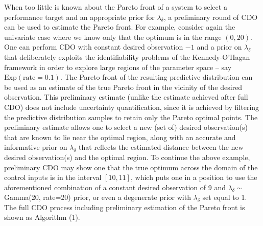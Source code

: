 \documentclass{article}
\begin{document}
When too little is known about the Pareto front of a system to select a performance target and an appropriate prior for $\lambda_\delta$, a preliminary round of CDO can be used to estimate the Pareto front.
%
For example, consider again the univariate case where we know only that the optimum is in the range $(0,20)$. 
%
One can perform CDO with constant desired observation $-1$ and a prior on $\lambda_\delta$ that deliberately exploits the identifiability problems of the Kennedy-O'Hagan framework in order to explore large regions of the parameter space -- say $\mathrm{Exp}(\mathrm{rate}=0.1)$. 
%
The Pareto front of the resulting predictive distribution can be used as an estimate of the true Pareto front in the vicinity of the desired observation.
%
This preliminary estimate (unlike the estimate achieved after full CDO) does not include uncertainty quantification, since it is achieved by filtering the predictive distribution samples to retain only the Pareto optimal points.
%
The preliminary estimate allows one to select a new (set of) desired observation(s) that are known to lie near the optimal region, along with an accurate and informative prior on $\lambda_\delta$ that reflects the estimated distance between the new desired observation(s) and the optimal region.
%
To continue the above example, preliminary CDO may show one that the true optimum across the domain of the control inputs is in the interval $[10,11]$, which puts one in a position to use the aforementioned combination of a constant desired observation of 9 and $\lambda_\delta\sim$ Gamma(20, rate=20) prior, or even a degenerate prior with $\lambda_\delta$ set equal to 1.
%
The full CDO process including preliminary estimation of the Pareto front is shown as Algorithm (1).
\end{document}
